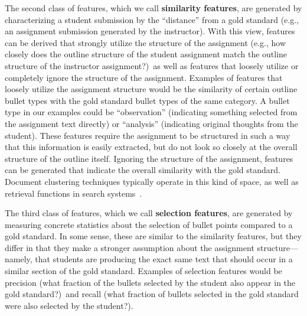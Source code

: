 The second class of features, which we call \textbf{similarity features},
are generated by characterizing a student submission by the ``distance''
from a gold standard (e.g., an assignment submission generated by the
instructor). With this view, features can be derived that strongly utilize
the structure of the assignment (e.g., how closely does the outline
structure of the student assignment match the outline structure of the
instructor assignment?)\ as well as features that loosely utilize or
completely ignore the structure of the assignment. Examples of features
that loosely utilize the assignment structure would be the similarity of
certain outline bullet types with the gold standard bullet types of the
same category. A bullet type in our examples could be ``observation''
(indicating something selected from the assignment text directly) or
``analysis'' (indicating original thoughts from the student). These
features require the assignment to be structured in such a way that this
information is easily extracted, but do not look so closely at the overall
structure of the outline itself. Ignoring the structure of the assignment,
features can be generated that indicate the overall similarity with the
gold standard. Document clustering techniques typically operate in this
kind of space, as well as retrieval functions in search
systems~\cite{Robertson:1994:SIGIR, Robertson:1996:TREC-3}.

The third class of features, which we call \textbf{selection features},
are generated by measuring concrete statistics about the selection of
bullet points compared to a gold standard. In some sense, these are similar
to the similarity features, but they differ in that they make a stronger
assumption about the assignment structure---namely, that students are
producing the exact same text that should occur in a similar section of the
gold standard. Examples of selection features would be precision (what
fraction of the bullets selected by the student also appear in the gold
standard?)\ and recall (what fraction of bullets selected in the gold
standard were also selected by the student?).


